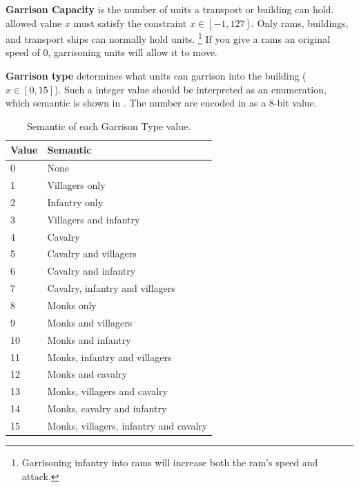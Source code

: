 \begin{appendices}
    \textbf{Garrison Capacity} is the number of units a transport or building can hold. allowed value $x$ must satisfy the constraint $x \in [-1, 127]$. Only rams, buildings, and transport ships can normally hold units. \footnote{Garrisoning infantry into rams will increase both the ram's speed and attack.} If you give a rams an original speed of 0, garrisoning units will allow it to move. 

    \textbf{Garrison type} determines what units can garrison into the building ($x \in [0, 15]$). Such a integer value should be interpreted as an enumeration, which semantic is shown in . The number are encoded in \genie{} as a 8-bit value\cite{agewiki:2014}.

    \begin{table}[ht]
        \centering
        \begin{tabular}{ll}
            \toprule
            Value & Semantic \\
            \midrule
            0   &   None \\
            1  &  Villagers only \\
            2  &  Infantry only \\
            3  &  Villagers and infantry \\
            4  &  Cavalry \\
            5  &  Cavalry and villagers \\
            6  &  Cavalry and infantry \\
            7  &  Cavalry, infantry and villagers \\
            8  &  Monks only \\
            9  &  Monks and villagers \\
            10  &  Monks and infantry \\
            11  &  Monks, infantry and villagers \\
            12  &  Monks and cavalry \\
            13  &  Monks, villagers and cavalry \\
            14  &  Monks, cavalry and infantry \\
            15  &  Monks, villagers, infantry and cavalry \\
            \bottomrule
        \end{tabular}
        \caption{Semantic of each Garrison Type value.}
        \label{tbl:garrisontype}
    \end{table}


\end{appendices}
